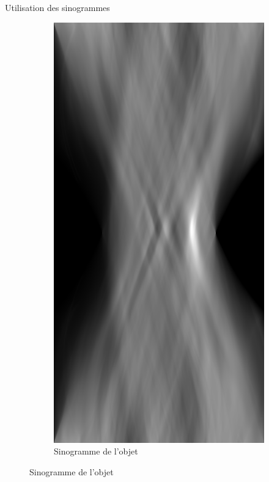 \documentclass{beamer}
\begin{document}
\begin{frame}{Utilisation des sinogrammes}
\begin{figure}[t]
\begin{subfigure}[b]{0.25\textwidth}
            \includegraphics[width=\textwidth]{sino_dent.png}
            \caption{Sinogramme de l'objet}
        \end{subfigure}
    \end{figure}
\end{frame}
\end{document}
